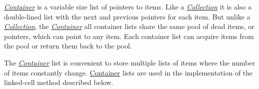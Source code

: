 {\em \hyperlink{classContainer}{Container}\/} is a variable size list of pointers to items. Like a {\em \hyperlink{classCollection}{Collection}\/} it is also a double-lined list with the next and previous pointers for each item. But unlike a {\em \hyperlink{classCollection}{Collection}\/}, the {\em \hyperlink{classContainer}{Container}\/} all container lists share the same pool of dead items, or pointers, which can point to any item. Each container list can acquire items from the pool or return them back to the pool.



The {\em \hyperlink{classContainer}{Container}\/} list is convenient to store multiple lists of items where the number of items constantly change. \hyperlink{classContainer}{Container} lists are used in the implementation of the linked-cell method described below. 